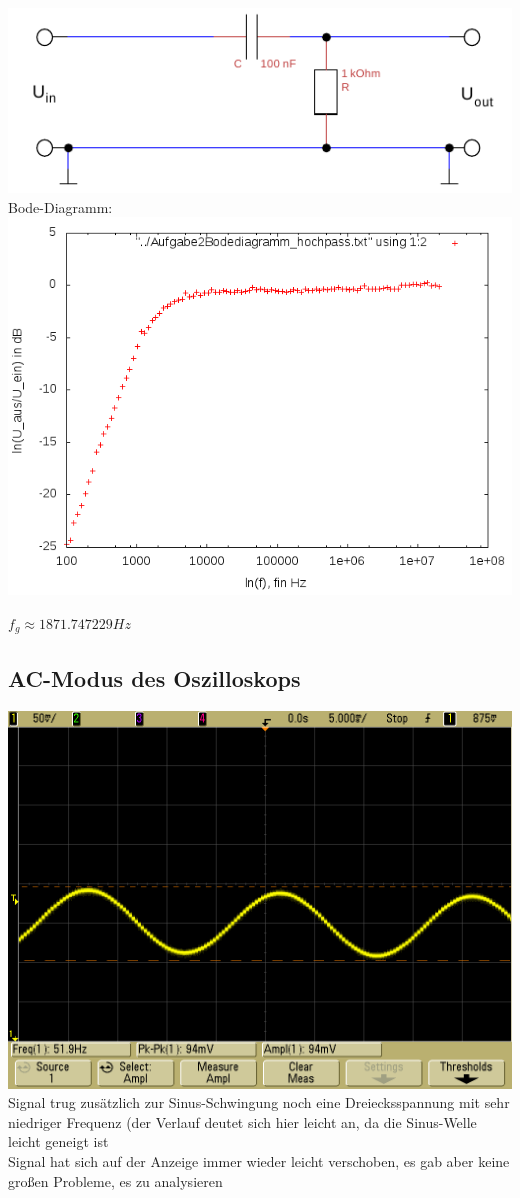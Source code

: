 \documentclass{article}
\begin{document}
\includegraphics[width=\textwidth]{../daten/Messdaten/plots/schalt_hoch}
Bode-Diagramm:\\
\includegraphics[width=\textwidth]{../daten/Messdaten/plots/Aufgabe2Bodediagramm_hochpass_gain}

$f_g \approx  1871.747229 Hz$

\subsection{AC-Modus des Oszilloskops}
\includegraphics[width=\textwidth]{../daten/scope_16}
Signal trug zusätzlich zur Sinus-Schwingung noch eine Dreiecksspannung mit sehr niedriger Frequenz (der Verlauf deutet sich hier leicht an, da die Sinus-Welle leicht geneigt ist \\
Signal hat sich auf der Anzeige immer wieder leicht verschoben, es gab aber keine großen Probleme, es zu analysieren
\end{document}

